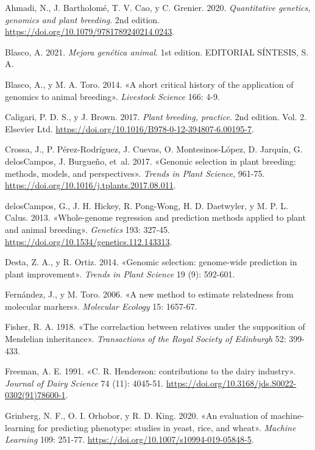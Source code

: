 \documentclass[11pt,spanish,a4paper,oneside,]{book} %
\begin{document}
\hypertarget{refs}{}
\leavevmode\hypertarget{ref-cite:33}{}%
Ahmadi, N., J. Bartholomé, T. V. Cao, y C. Grenier. 2020. \emph{Quantitative genetics, genomics and plant breeding}. 2nd edition. \url{https://doi.org/10.1079/9781789240214.0243}.

\leavevmode\hypertarget{ref-cite:21}{}%
Blasco, A. 2021. \emph{Mejora genética animal}. 1st edition. EDITORIAL SÍNTESIS, S. A.

\leavevmode\hypertarget{ref-cite:3}{}%
Blasco, A., y M. A. Toro. 2014. «A short critical history of the application of genomics to animal breeding». \emph{Livestock Science} 166: 4-9.

\leavevmode\hypertarget{ref-cite:42}{}%
Caligari, P. D. S., y J. Brown. 2017. \emph{Plant breeding, practice}. 2nd edition. Vol. 2. Elsevier Ltd. \url{https://doi.org/10.1016/B978-0-12-394807-6.00195-7}.

\leavevmode\hypertarget{ref-cite:37}{}%
Crossa, J., P. Pérez-Rodríguez, J. Cuevas, O. Montesinos-López, D. Jarquín, G. delosCampos, J. Burgueño, et~al. 2017. «Genomic selection in plant breeding: methods, models, and perspectives». \emph{Trends in Plant Science}, 961-75. \url{https://doi.org/10.1016/j.tplants.2017.08.011}.

\leavevmode\hypertarget{ref-cite:31}{}%
delosCampos, G., J. H. Hickey, R. Pong-Wong, H. D. Daetwyler, y M. P. L. Calus. 2013. «Whole-genome regression and prediction methods applied to plant and animal breeding». \emph{Genetics} 193: 327-45. \url{https://doi.org/10.1534/genetics.112.143313}.

\leavevmode\hypertarget{ref-cite:10}{}%
Desta, Z. A., y R. Ortiz. 2014. «Genomic selection: genome-wide prediction in plant improvement». \emph{Trends in Plant Science} 19 (9): 592-601.

\leavevmode\hypertarget{ref-cite:24}{}%
Fernández, J., y M. Toro. 2006. «A new method to estimate relatedness from molecular markers». \emph{Molecular Ecology} 15: 1657-67.

\leavevmode\hypertarget{ref-cite:1}{}%
Fisher, R. A. 1918. «The correlaction between relatives under the supposition of Mendelian inheritance». \emph{Transactions of the Royal Society of Edinburgh} 52: 399-433.

\leavevmode\hypertarget{ref-cite:28}{}%
Freeman, A. E. 1991. «C. R. Henderson: contributions to the dairy industry». \emph{Journal of Dairy Science} 74 (11): 4045-51. \url{https://doi.org/10.3168/jds.S0022-0302(91)78600-1}.

\leavevmode\hypertarget{ref-cite:35}{}%
Grinberg, N. F., O. I. Orhobor, y R. D. King. 2020. «An evaluation of machine-learning for predicting phenotype: studies in yeast, rice, and wheat». \emph{Machine Learning} 109: 251-77. \url{https://doi.org/10.1007/s10994-019-05848-5}.
\end{document}
